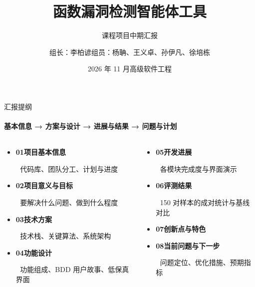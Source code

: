 \documentclass{beamer}
\title{函数漏洞检测智能体工具}
\subtitle{课程项目中期汇报}
\author{组长：李柏谚\quad 组员：杨聃、王义卓、孙伊凡、徐培栋}
\date{2026 年 11 月\quad 高级软件工程}
\begin{document}
\maketitle

\begin{frame}{汇报提纲}
\framesubtitle{基本信息 → 方案与设计 → 进展与结果 → 问题与计划}
\small
\begin{columns}[t]
\begin{column}{0.48\textwidth}
\begin{itemize}
  \item \textbf{01\quad 项目基本信息}
  \item[$\;$] 代码库、团队分工、计划与进度
  \item \textbf{02\quad 项目意义与目标}
  \item[$\;$] 要解决什么问题、做到什么程度
  \item \textbf{03\quad 技术方案}
  \item[$\;$] 技术栈、关键算法、系统架构
  \item \textbf{04\quad 功能设计}
  \item[$\;$] 功能组成、BDD 用户故事、低保真界面
\end{itemize}
\end{column}
\begin{column}{0.48\textwidth}
\begin{itemize}
  \item \textbf{05\quad 开发进展}
  \item[$\;$] 各模块完成度与界面演示
  \item \textbf{06\quad 评测结果}
  \item[$\;$] 150 对样本的成对统计与基线对比
  \item \textbf{07\quad 创新点与特色}
  \item \textbf{08\quad 当前问题与下一步}
  \item[$\;$] 问题定位、优化措施、预期指标
\end{itemize}
\end{column}
\end{columns}
\end{frame}
\end{document}
